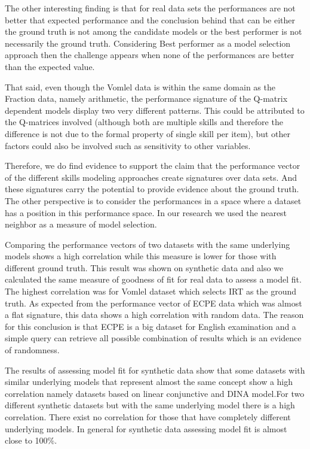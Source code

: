 The other interesting finding is that for real data sets the performances are not better that expected performance and the conclusion behind that can be either the ground truth is not among the candidate models or the best performer is not necessarily the ground truth. Considering Best performer as a model selection approach then the challenge appears when none of the performances are better than the expected value.

That said, even though the Vomlel data is within the same domain as the Fraction data, namely arithmetic, the performance signature of the Q-matrix dependent models display two very different patterns.  This could be attributed to the Q-matrices involved (although both are multiple skills and therefore the difference is not due to the formal property of single skill per item), but other factors could also be involved such as sensitivity to other variables.

Therefore, we do find evidence to support the claim that the performance vector of the different skills modeling approaches create signatures over data sets.  And these signatures carry the potential to provide evidence about the ground truth. The other perspective is to consider the performances in a space where a dataset has a position in this performance space. In our research we used the nearest neighbor as a measure of model selection.

Comparing the performance vectors of two datasets with the same underlying models shows a high correlation while this measure is lower for those with different ground truth. This result was shown on synthetic data and also we calculated the same measure of goodness of fit for real data to assess a model fit. The highest correlation was for Vomlel dataset which selects IRT as the ground truth. As expected from the performance vector of ECPE data which was almost a flat signature, this data shows a high correlation with random data. The reason for this conclusion is that ECPE is a big dataset for English examination and a simple query can retrieve all possible combination of results which is an evidence of randomness.

The results of assessing model fit for synthetic data show that some datasets with similar underlying models that represent almost the same concept show a high correlation namely datasets based on linear conjunctive and DINA model.For two different synthetic datasets but with the same underlying model there is a high correlation. There exist no correlation for those that have completely different underlying models. In general for synthetic data assessing model fit is almost close to 100\%. 

